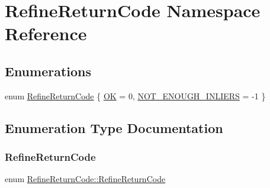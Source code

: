 \hypertarget{namespaceRefineReturnCode}{}\section{Refine\+Return\+Code Namespace Reference}
\label{namespaceRefineReturnCode}
\subsection*{Enumerations}
\begin{DoxyCompactItemize}
\item 
enum \hyperlink{namespaceRefineReturnCode_a54e2cd5f4af90ff2df55bf63455d1959}{Refine\+Return\+Code} \{ \hyperlink{namespaceRefineReturnCode_a54e2cd5f4af90ff2df55bf63455d1959af7afdc3f9a9d0e3ee3e177cf5f5f9841}{OK} = 0, 
\hyperlink{namespaceRefineReturnCode_a54e2cd5f4af90ff2df55bf63455d1959aa7e9b732c19c32b516e07f10aedd581c}{N\+O\+T\+\_\+\+E\+N\+O\+U\+G\+H\+\_\+\+I\+N\+L\+I\+E\+RS} = -\/1
 \}
\end{DoxyCompactItemize}


\subsection{Enumeration Type Documentation}
\mbox{\label{namespaceRefineReturnCode_a54e2cd5f4af90ff2df55bf63455d1959}} 
\subsubsection{\texorpdfstring{Refine\+Return\+Code}{RefineReturnCode}}
{\footnotesize\ttfamily enum \hyperlink{namespaceRefineReturnCode_a54e2cd5f4af90ff2df55bf63455d1959}{Refine\+Return\+Code\+::\+Refine\+Return\+Code}}

